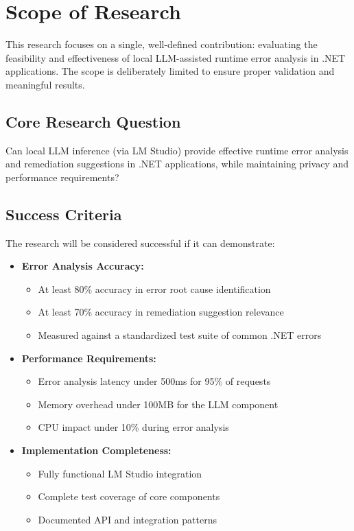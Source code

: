 \section{Scope of Research}\label{sec:scope}

This research focuses on a single, well-defined contribution: evaluating the feasibility and effectiveness of local LLM-assisted runtime error analysis in .NET applications. The scope is deliberately limited to ensure proper validation and meaningful results.

\subsection{Core Research Question}
Can local LLM inference (via LM Studio) provide effective runtime error analysis and remediation suggestions in .NET applications, while maintaining privacy and performance requirements?

\subsection{Success Criteria}
The research will be considered successful if it can demonstrate:

\begin{itemize}
    \item \textbf{Error Analysis Accuracy:}
    \begin{itemize}
        \item At least 80\% accuracy in error root cause identification
        \item At least 70\% accuracy in remediation suggestion relevance
        \item Measured against a standardized test suite of common .NET errors
    \end{itemize}
    \item \textbf{Performance Requirements:}
    \begin{itemize}
        \item Error analysis latency under 500ms for 95\% of requests
        \item Memory overhead under 100MB for the LLM component
        \item CPU impact under 10\% during error analysis
    \end{itemize}
    \item \textbf{Implementation Completeness:}
    \begin{itemize}
        \item Fully functional LM Studio integration
        \item Complete test coverage of core components
        \item Documented API and integration patterns
    \end{itemize}
\end{itemize}

